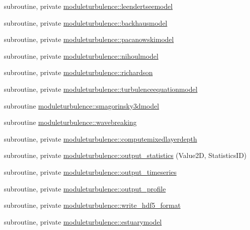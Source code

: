 \begin{DoxyCompactItemize}
\item 
subroutine, private \mbox{\hyperlink{namespacemoduleturbulence_aaab5a3be952e034c14a581ba00fb2d22}{moduleturbulence\+::leendertseemodel}}
\item 
subroutine, private \mbox{\hyperlink{namespacemoduleturbulence_a823fa2230f79873d97eb37068c46756f}{moduleturbulence\+::backhausmodel}}
\item 
subroutine, private \mbox{\hyperlink{namespacemoduleturbulence_ac17c49932990b363ac1d4fc06653ff7a}{moduleturbulence\+::pacanowskimodel}}
\item 
subroutine, private \mbox{\hyperlink{namespacemoduleturbulence_a403c337f711237d4bc2b5d439e974a19}{moduleturbulence\+::nihoulmodel}}
\item 
subroutine, private \mbox{\hyperlink{namespacemoduleturbulence_aaa0e2c6e1a9ea1d07cb81974aeb2b1f8}{moduleturbulence\+::richardson}}
\item 
subroutine, private \mbox{\hyperlink{namespacemoduleturbulence_ab1caba5ca0b728449a98a3884fda59e8}{moduleturbulence\+::turbulenceequationmodel}}
\item 
subroutine \mbox{\hyperlink{namespacemoduleturbulence_ab31d00156edd7f09041fb314d6d0445a}{moduleturbulence\+::smagorinsky3dmodel}}
\item 
subroutine \mbox{\hyperlink{namespacemoduleturbulence_a60c4e6500b8bfaf5e8e8a202db2203ba}{moduleturbulence\+::wavebreaking}}
\item 
subroutine, private \mbox{\hyperlink{namespacemoduleturbulence_ad38c50749e5db481714069b7e366c4e7}{moduleturbulence\+::computemixedlayerdepth}}
\item 
subroutine, private \mbox{\hyperlink{namespacemoduleturbulence_a217345ed46e74ae2c1880a07108c9487}{moduleturbulence\+::output\+\_\+statistics}} (Value2D, Statistics\+ID)
\item 
subroutine, private \mbox{\hyperlink{namespacemoduleturbulence_ad434d19fe537a51091b39515c951a2a3}{moduleturbulence\+::output\+\_\+timeseries}}
\item 
subroutine, private \mbox{\hyperlink{namespacemoduleturbulence_a72996c619e984f58e135b17214de8718}{moduleturbulence\+::output\+\_\+profile}}
\item 
subroutine, private \mbox{\hyperlink{namespacemoduleturbulence_a256cd0709bb85cc0f9cd463e00938709}{moduleturbulence\+::write\+\_\+hdf5\+\_\+format}}
\item 
subroutine, private \mbox{\hyperlink{namespacemoduleturbulence_abcd63973fdc2c7e7d3ad23e011bee2d5}{moduleturbulence\+::estuarymodel}}

\end{DoxyCompactItemize}
